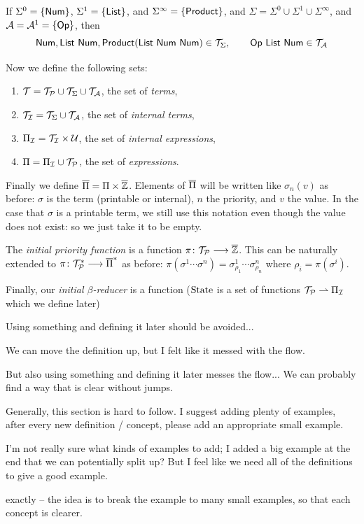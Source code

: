 \documentclass{llncs}
\newcommand{\yoni}[1]{{\begin{mdframed}[linecolor=red]{\color{red}#1}\end{mdframed}}}
\newcommand{\ari}[1]{{\begin{mdframed}[linecolor=blue]{\color{blue}#1}\end{mdframed}}}
\begin{document}
\begin{example}

    If $\Sigma^{0}=\{\mathsf{Num}\}$, $\Sigma^{1}=\{\mathsf{List}\}$, and $\Sigma^{\infty}=\{\mathsf{Product}\}$, and $\Sigma=\Sigma^0\cup\Sigma^1\cup\Sigma^\infty$, and $\c A=\mathcal A^1=\set{\OP}$, 
    then
    \[ \NUM,\LIST\ \NUM,\PRODUCT(\LIST\ \NUM\ \NUM)\in\terms,\qquad \OP\ \LIST\ \NUM\in\terma \]

\end{example}

Now we define the following sets:
\begin{enumerate}
    \item $\mathcal T=\mathcal T_{\mathcal P}\cup\mathcal T_{\Sigma}\cup\mathcal T_{\mathcal A}$, the set of \textit{terms},
    \item $\mathcal T_{\mathcal I}=\mathcal T_{\Sigma}\cup\mathcal T_{\mathcal A}$, the set of \textit{internal terms},
    \item $\Pi_{\mathcal I}=\mathcal T_{\mathcal I}\times\mathcal U$, the set of \textit{internal expressions},
    \item $\Pi=\Pi_{\mathcal I}\cup\mathcal T_{\mathcal P}$, the set of \textit{expressions}.
\end{enumerate}
Finally we define $\overline{\Pi}=\Pi\times\overline{\mathbb Z}$.
Elements of $\overline{\Pi}$ will be written like $\sigma_n(v)$ as before: $\sigma$ is the term (printable or internal), $n$ the priority, and $v$ the value.
In the case that $\sigma$ is a printable term, we still use this notation even though the value does not exist: so we just take it to be empty.

The \textit{initial priority function} is a function $\pi\colon\mathcal T_{\mathcal P}\longrightarrow\overline{\mathbb Z}$.
This can be naturally extended to $\pi\colon\mathcal T_{\mathcal P}^*\longrightarrow\overline{\Pi}^*$ as before: $\pi(\sigma^1\cdots\sigma^n)=\sigma^1_{\rho_1}\cdots\sigma^n_{\rho_n}$ where $\rho_i=\pi(\sigma^i)$.

Finally, our \textit{initial $\beta$-reducer} is a function ($\mathrm{State}$ is a set of functions $\mathcal T_{\mathcal P}\rightharpoonup\Pi_{\mathcal I}$ which we define later)
\yoni{Using something and defining it later should be avoided...}
\ari{We can move the definition up, but I felt like it messed with the flow.}
\yoni{But also using something and defining it later messes the flow... We can probably find a way that is clear without jumps.}

\yoni{Generally, this section is hard to follow. I suggest adding plenty of examples, after every new definition / concept, please add an appropriate small example.}
\ari{I'm not really sure what kinds of examples to add; I added a big example at the end that we can potentially split up?
But I feel like we need all of the definitions to give a good example.}
\yoni{exactly -- the idea is to break the example to many small examples, so that each concept is clearer.}
\end{document}
